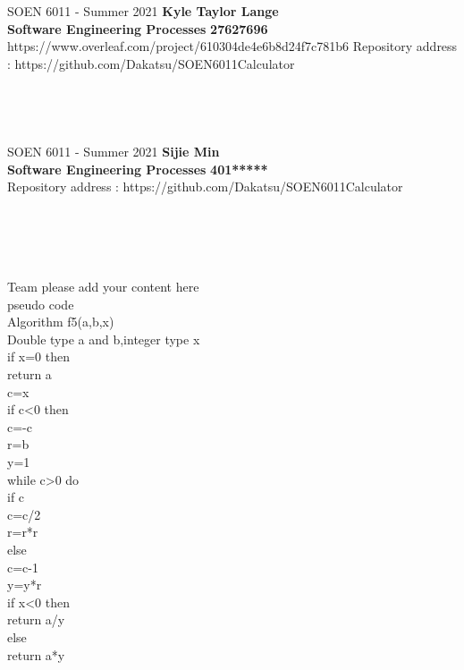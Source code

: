 \documentclass[a4paper, 11pt]{report}
\begin{document}
\section*{}
\normalsize {SOEN 6011 - Summer 2021} \hfill \textbf{Kyle Taylor Lange} \\
\textbf{ Software Engineering Processes}  \hfill \textbf{27627696} \\https://www.overleaf.com/project/610304de4e6b8d24f7c781b6
\hfill Repository address : https://github.com/Dakatsu/SOEN6011Calculator
\\\\\\

\pagebreak

\section*{}
\normalsize {SOEN 6011 - Summer 2021} \hfill \textbf{Sijie Min} \\
\textbf{ Software Engineering Processes}  \hfill \textbf{401*****} \\
\hfill Repository address : https://github.com/Dakatsu/SOEN6011Calculator
\\\\\\\\\\
 \begin{center} Team please add your content here 
 \\pseudo code
 \\Algorithm f5(a,b,x)
\\Double type a and b,integer type x
	\\if x=0 then
	\\	return a
\\	c=x
	\\if c<0 then
	\\	c=-c
\\	r=b
\\	y=1
\\	while c>0 do
	\\	if c%
	\\		c=c/2
	\\		r=r*r
	\\	else
	\\		c=c-1
	\\		y=y*r
\\	if x<0 then
\\		return a/y
\\	else
\\		return a*y
 
 \end{center}
\pagebreak
\end{document}
